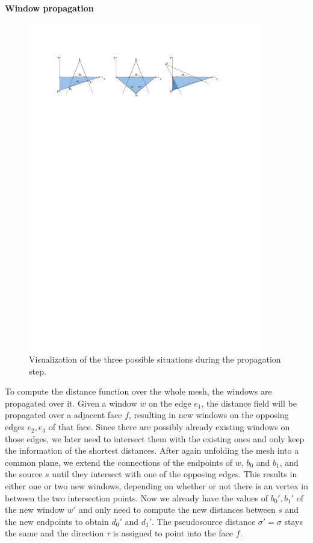 \paragraph{Window propagation}
\begin{figure}[h]
	\centering
	\includegraphics[width = 0.9\textwidth]{pictures/geodesics_new_windows}
	\caption{Visualization of the three possible situations during the propagation step.}
	\label{fig:geo_new_windows}
\end{figure}
To compute the distance function over the whole mesh, the windows are propagated over it.
Given a window $w$ on the edge $e_1$, the distance field will be propagated over a adjacent face $f$, resulting in new windows on the opposing edges $e_2,e_3$ of that face.
Since there are possibly already existing windows on those edges, we later need to intersect them with the existing ones and only keep the information of the shortest distances.
After again unfolding the mesh into a common plane, we extend the connections of the endpoints of $w$, $b_0$ and $b_1$, and the source $s$ until they intersect with one of the opposing edges.
This results in either one or two new windows, depending on whether or not there is an vertex in between the two intersection points.
Now we already have the values of $b_0', b_1'$ of the new window $w'$ and only need to compute the new distances between $s$ and the new endpoints to obtain $d_0'$ and $d_1'$.
The pseudosource distance $\sigma' = \sigma$ stays the same and the direction $\tau$ is assigned to point into the face $f$.

